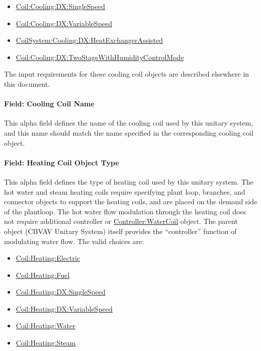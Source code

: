 \begin{itemize}
\item
  \hyperref[coilcoolingdxsinglespeed]{Coil:Cooling:DX:SingleSpeed}
\item
  \hyperref[coilcoolingdxvariablespeed]{Coil:Cooling:DX:VariableSpeed}
\item
  \hyperref[coilsystemcoolingdxheatexchangerassisted]{CoilSystem:Cooling:DX:HeatExchangerAssisted}
\item
  \hyperref[coilcoolingdxtwostagewithhumiditycontrolmode]{Coil:Cooling:DX:TwoStageWithHumidityControlMode}
\end{itemize}

The input requirements for these cooling coil objects are described elsewhere in this document.

\paragraph{Field: Cooling Coil Name}\label{field-cooling-coil-name-6}

This alpha field defines the name of the cooling coil used by this unitary system, and this name should match the name specified in the corresponding cooling coil object.

\paragraph{Field: Heating Coil Object Type}\label{field-heating-coil-object-type-8}

This alpha field defines the type of heating coil used by this unitary system. The hot water and steam heating coils require specifying plant loop, branches, and connector objects to support the heating coils, and are placed on the demand side of the plantloop. The hot water flow modulation through the heating coil does not require additional controller or \hyperref[controllerwatercoil]{Controller:WaterCoil} object. The parent object (CBVAV Unitary System) itself provides the ``controller'' function of modulating water flow. The valid choices are:

\begin{itemize}
\item
  \hyperref[coilheatingelectric]{Coil:Heating:Electric}
\item
  \hyperref[coilheatinggas-000]{Coil:Heating:Fuel}
\item
  \hyperref[coilheatingdxsinglespeed]{Coil:Heating:DX:SingleSpeed}
\item
  \hyperref[coilheatingdxvariablespeed]{Coil:Heating:DX:VariableSpeed}
\item
  \hyperref[coilheatingwater]{Coil:Heating:Water}
\item
  \hyperref[coilheatingsteam]{Coil:Heating:Steam}
\end{itemize}

